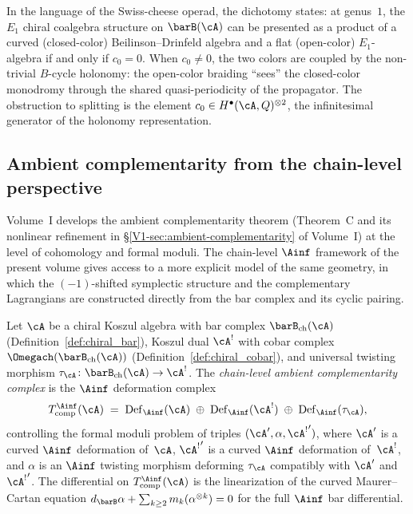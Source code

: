 \begin{remark}
In the language of the Swiss-cheese operad, the dichotomy
states: at genus~$1$, the $E_1$ chiral coalgebra structure
on $\barB(\cA)$ can be presented as a product of a curved
(closed-color) Beilinson--Drinfeld algebra and a flat (open-color)
$E_1$-algebra if and only if $c_0 = 0$. When $c_0 \ne 0$,
the two colors are coupled by the non-trivial $B$-cycle
holonomy: the open-color braiding ``sees'' the closed-color
monodromy through the shared quasi-periodicity of the
propagator. The obstruction to splitting is the element
$c_0 \in H^\bullet(\cA,Q)^{\otimes 2}$, the infinitesimal
generator of the holonomy representation.
\end{remark}


\subsection{Ambient complementarity from the chain-level perspective}

Volume~I develops the ambient complementarity theorem
(Theorem~C and its nonlinear refinement in \S\ref*{V1-sec:ambient-complementarity}
of Volume~I) at the level of cohomology and formal moduli.
The chain-level $\Ainf$ framework of the present volume gives
access to a more explicit model of the same geometry, in which
the $(-1)$-shifted symplectic structure and the complementary
Lagrangians are constructed directly from the bar complex and its
cyclic pairing.

\begin{definition}
Let $\cA$ be a chiral Koszul algebra with bar complex
$\barB_{\mathrm{ch}}(\cA)$
(Definition~\ref{def:chiral_bar}), Koszul dual $\cA^!$
with cobar complex $\Omegach(\barB_{\mathrm{ch}}(\cA))$
(Definition~\ref{def:chiral_cobar}), and universal
twisting morphism
$\tau_\cA \colon \barB_{\mathrm{ch}}(\cA) \to \cA^!$.
The \emph{chain-level ambient complementarity complex} is the
$\Ainf$ deformation complex
\[
T_{\mathrm{comp}}^{\Ainf}(\cA)
\;=\;
\mathrm{Def}_{\Ainf}(\cA)
\;\oplus\;
\mathrm{Def}_{\Ainf}(\cA^!)
\;\oplus\;
\mathrm{Def}_{\Ainf}(\tau_\cA),
\]
controlling the formal moduli problem of triples
$({\cA}', \alpha, {\cA^!}')$, where ${\cA}'$ is a curved
$\Ainf$ deformation of~$\cA$, ${\cA^!}'$ is a curved
$\Ainf$ deformation of~$\cA^!$, and $\alpha$ is an $\Ainf$
twisting morphism deforming $\tau_\cA$ compatibly with
${\cA}'$ and~${\cA^!}'$. The differential on
$T_{\mathrm{comp}}^{\Ainf}(\cA)$ is the linearization of
the curved Maurer--Cartan equation
$d_{\barB}\alpha
+ \sum_{k \ge 2} m_k(\alpha^{\otimes k}) = 0$
for the full $\Ainf$ bar differential.
\end{definition}

